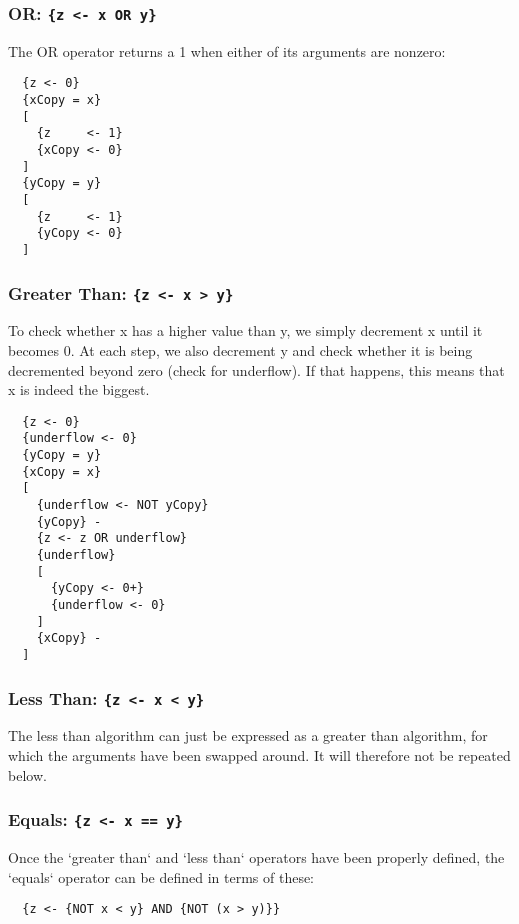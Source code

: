 \tocless\subsubsection{OR: \texttt{\{z <- x OR y\}}}
The OR operator returns a 1 when either of its arguments are nonzero:
\begin{lstlisting}
  {z <- 0}
  {xCopy = x}
  [
    {z     <- 1}
    {xCopy <- 0}
  ]
  {yCopy = y}
  [
    {z     <- 1}
    {yCopy <- 0}
  ]
\end{lstlisting}

\tocless\subsubsection{Greater Than: \texttt{\{z <- x > y\}}}
To check whether x has a higher value than y, we simply decrement x until it becomes 0. At each step, we also decrement y and check whether it is being decremented beyond zero (check for underflow). If that happens, this means that x is indeed the biggest.
\begin{lstlisting}
  {z <- 0}
  {underflow <- 0}
  {yCopy = y}
  {xCopy = x}
  [
    {underflow <- NOT yCopy}
    {yCopy} -
    {z <- z OR underflow}
    {underflow}
    [
      {yCopy <- 0+}
      {underflow <- 0}
    ]
    {xCopy} -
  ]
\end{lstlisting}

\tocless\subsubsection{Less Than: \texttt{\{z <- x < y\}}}
The less than algorithm can just be expressed as a greater than algorithm, for which the arguments have been swapped around. It will therefore not be repeated below.

\tocless\subsubsection{Equals: \texttt{\{z <- x == y\}}}
Once the `greater than` and `less than` operators have been properly defined, the `equals` operator can be defined in terms of these:
\begin{lstlisting}
  {z <- {NOT x < y} AND {NOT (x > y)}}
\end{lstlisting}

